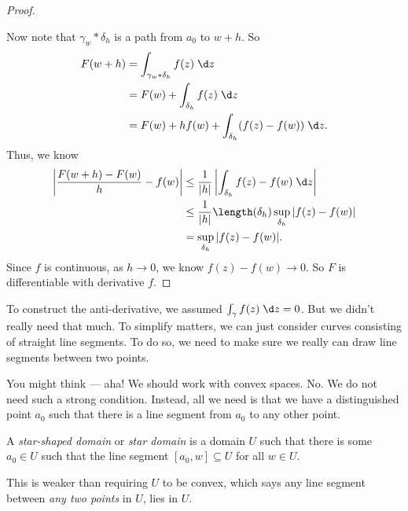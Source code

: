 \documentclass[a4paper]{article}
\begin{document}
\begin{proof}
\begin{center}
  \end{center}
  Now note that $\gamma_w * \delta_h$ is a path from $a_0$ to $w + h$. So
  \begin{align*}
    F(w + h) &= \int_{\gamma_w * \delta_h} f(z)\;\d z\\
    &= F(w) + \int_{\delta_h} f(z)\;\d z\\
    &= F(w) + hf(w) + \int_{\delta_h} (f(z) - f(w))\;\d z.
  \end{align*}
  Thus, we know
  \begin{align*}
    \left|\frac{F(w + h) - F(w)}{h} - f(w)\right| &\leq \frac{1}{|h|} \left|\int_{\delta_h} f(z) - f(w)\;\d z\right| \\
    &\leq \frac{1}{|h|} \length(\delta_h) \sup_{\delta_h} |f(z) - f(w)|\\
    &=\sup_{\delta_h} |f(z) - f(w)|.
  \end{align*}
  Since $f$ is continuous, as $h \to 0$, we know $f(z) - f(w) \to 0$. So $F$ is differentiable with derivative $f$.
\end{proof}
To construct the anti-derivative, we assumed $\int_\gamma f(z) \;\d z = 0$. But we didn't really need that much. To simplify matters, we can just consider curves consisting of straight line segments. To do so, we need to make sure we really can draw line segments between two points.

You might think --- aha! We should work with convex spaces. No. We do not need such a strong condition. Instead, all we need is that we have a distinguished point $a_0$ such that there is a line segment from $a_0$ to any other point.

\begin{defi}
  A \emph{star-shaped domain} or \emph{star domain} is a domain $U$ such that there is some $a_0 \in U$ such that the line segment $[a_0, w] \subseteq U$ for all $w \in U$.
  \begin{center}
  \end{center}
\end{defi}
This is weaker than requiring $U$ to be convex, which says any line segment between \emph{any two points} in $U$, lies in $U$.
\end{document}
